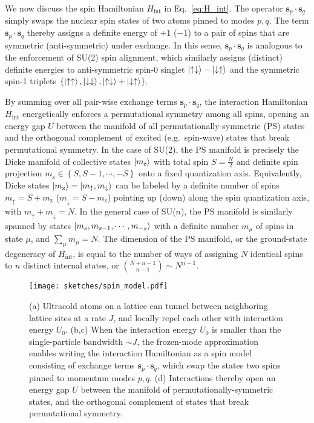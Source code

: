 \documentclass[nofootinbib,twocolumn]{revtex4-2}
\renewcommand{\t}{\text} %
\renewcommand{\set}[1]{\left\{#1\right\}} %
\renewcommand{\v}{\bm} %
\renewcommand{\c}{\cdot} %
\newcommand{\1}{\mathds{1}}
\newcommand{\up}{\uparrow}
\newcommand{\dn}{\downarrow}
\newcommand{\z}{\text{z}}
\begin{document}
We now discuss the spin Hamiltonian $H_{\t{int}}$ in Eq.~\eqref{eq:H_int}.
The operator $\v s_p\c\v s_q$ simply swaps the nuclear spin states of two atoms pinned to modes $p,q$.
The term $\v s_p\c\v s_q$ thereby assigns a definite energy of $+1$ ($-1$) to a pair of spins that are symmetric (anti-symmetric) under exchange.
In this sense, $\v s_p\c\v s_q$ is analogous to the enforcement of SU(2) spin alignment, which similarly assigns (distinct) definite energies to anti-symmetric spin-0 singlet $\ket{\up\dn}-\ket{\dn\up}$ and the symmetric spin-1 triplets $\set{\ket{\up\up},\ket{\dn\dn},\ket{\up\dn}+\ket{\dn\up}}$.

By summing over all pair-wise exchange terms $\v s_p\c\v s_q$, the interaction Hamiltonian $H_{\t{int}}$ energetically enforces a permutational symmetry among all spins, opening an energy gap $U$ between the manifold of all permutationally-symmetric (PS) states and the orthogonal complement of excited (e.g.~spin-wave) states that break permutational symmetry.
In the case of SU(2), the PS manifold is precisely the Dicke manifold of collective states $\ket{m_\z}$ with total spin $S=\frac{N}{2}$ and definite spin projection $m_\z\in\set{S,S-1,\cdots,-S}$ onto a fixed quantization axis.
Equivalently, Dicke states $\ket{m_\z}=\ket{m_\up,m_\dn}$ can be labeled by a definite number of spins $m_\up=S+m_\z$ ($m_\dn=S-m_\z$) pointing up (down) along the spin quantization axis, with $m_\up+m_\dn=N$.
In the general case of SU($n$), the PS manifold is similarly spanned by states $\ket{m_s,m_{s-1},\cdots,m_{-s}}$ with a definite number $m_\mu$ of spins in state $\mu$, and $\sum_\mu m_\mu=N$.
The dimension of the PS manifold, or the ground-state degeneracy of $H_{\t{int}}$, is equal to the number of ways of assigning $N$ identical spins to $n$ distinct internal states, or ${N+n-1 \choose n-1} \sim N^{n-1}$.

\begin{figure}
\centering
\texttt{[image: sketches/spin\_model.pdf]}
\caption{
(a) Ultracold atoms on a lattice can tunnel between neighboring lattice sites at a rate $J$, and locally repel each other with interaction energy $U_0$.
(b,c) When the interaction energy $U_0$ is smaller than the single-particle bandwidth $\sim J$, the frozen-mode approximation enables writing the interaction Hamiltonian as a spin model consisting of exchange terms $\v s_p\c\v s_q$, which swap the states two spins pinned to momentum modes $p,q$.
(d) Interactions thereby open an energy gap $U$ between the manifold of permutationally-symmetric states, and the orthogonal complement of states that break permutational symmetry.
}
\label{fig:spin_model}
\end{figure}
\end{document}

